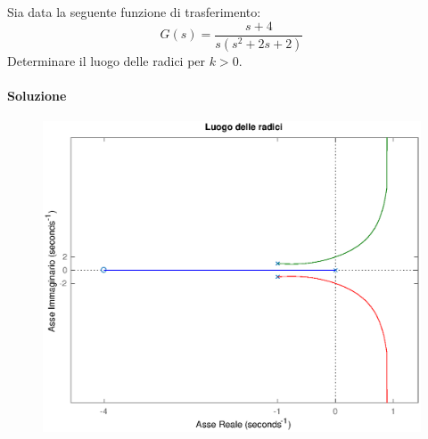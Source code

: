 \exercise{}
Sia data la seguente funzione di trasferimento:
\[
	G(s) = \frac{s+4}{s(s^2+2s+2)}
\]
Determinare il luogo delle radici per \(k>0\).

\paragraph{Soluzione}

\begin{figure}[ht]
	\centering
	\includegraphics[scale=.6]{mod1/assets/rl_ex312}
\end{figure}


